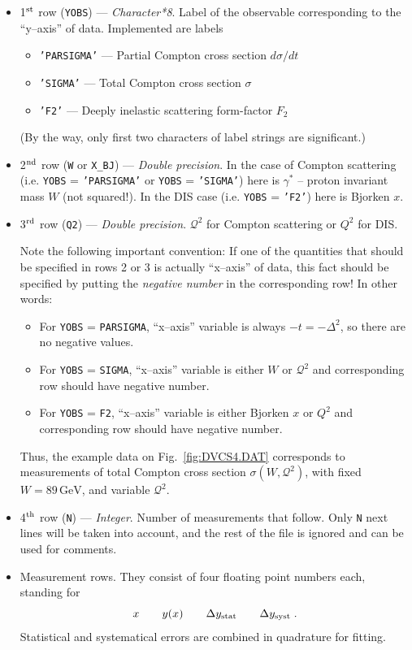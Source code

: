 \documentclass[12pt]{article}
\newcounter{comment}
\begin{document}
\begin{itemize}
\item 
1$^{\rm st}$ row (\texttt{YOBS}) --- \emph{Character*8}. Label of the observable
corresponding to the ``y--axis'' of data. Implemented are labels
  \begin{itemize}
  \item \texttt{'PARSIGMA'} --- Partial Compton cross section $d\sigma/d t$  
  \item \texttt{'SIGMA'} --- Total Compton cross section $\sigma$  
  \item \texttt{'F2'} --- Deeply inelastic scattering form-factor $F_2$  
  \end{itemize} 
(By the way, only first two characters of label strings are significant.)


\item 
2$^{\rm nd}$ row (\texttt{W} or \texttt{X\_BJ}) --- \emph{Double precision}.
In the case of Compton scattering (i.e. \texttt{YOBS} = \texttt{'PARSIGMA'} or
\texttt{YOBS} = \texttt{'SIGMA'}) here is $\gamma^*$ -- proton invariant mass
$W$ (not squared!). In the DIS case (i.e. \texttt{YOBS} = \texttt{'F2'})
here is Bjorken $x$.

\item 
3$^{\rm rd}$ row (\texttt{Q2}) --- \emph{Double precision}. $\mathcal{Q}^2$
for Compton scattering or $Q^2$ for DIS.

Note the following important convention: If one of the quantities that should
be specified in rows 2 or 3 is actually ``x--axis'' of data, this fact
should be specified by putting the \emph{negative number} in the corresponding row!
In other words:
\begin{itemize}
\item 
For \texttt{YOBS} = \texttt{PARSIGMA}, ``x--axis'' variable is 
always $-t = - \Delta^2$, so there are no negative values.
\item 
For \texttt{YOBS} = \texttt{SIGMA}, ``x--axis'' variable is 
either $W$ or $\mathcal{Q}^2$ and corresponding row should have negative number.
\item 
For \texttt{YOBS} = \texttt{F2}, ``x--axis'' variable is 
either Bjorken $x$ or $Q^2$ and corresponding row should have negative number.
\end{itemize}
Thus, the example data on Fig.~\ref{fig:DVCS4.DAT} corresponds to
measurements of total Compton cross section $\sigma(W, \mathcal{Q}^2)$, with
fixed $W = 89\, \textrm{GeV}$, and variable $\mathcal{Q}^2$.

\item 
4$^{\rm th}$ row (\texttt{N}) --- \emph{Integer}. Number of measurements that
follow. Only \texttt{N} next lines will be taken into account, and the
rest of the file is ignored and can be used for comments.

\item
Measurement rows. They consist of four floating point numbers each,
standing for 
\[
 x \qquad y(x) \qquad \Delta y_{\rm stat} \qquad
\Delta y_{\rm syst} \;.
\]
Statistical and systematical errors are combined in quadrature for fitting.

\end{itemize}
\end{document}
